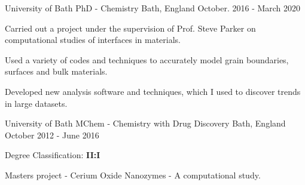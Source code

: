\begin{cventries}
  \cventry
    {University of Bath}
    {PhD - Chemistry}
    {Bath, England}
    {October. 2016 - March 2020}
    {
      \begin{cvitems}
        \item {Carried out a project under the supervision of Prof. Steve Parker on computational studies of interfaces in materials}.
        \item {Used a variety of codes and techniques to accurately model grain boundaries, surfaces and bulk materials.}
        \item {Developed new analysis software and techniques, which I used to discover trends in large datasets. }
      \end{cvitems}
    }
\end{cventries}

\begin{cventries}
  \cventry
    {University of Bath}
    {MChem - Chemistry with Drug Discovery}
    {Bath, England}
    {October 2012 - June 2016}
    {
      \begin{cvitems}
        \item {Degree Classification: \textbf{II:I}}
        \item {Masters project - Cerium Oxide Nanozymes - A computational study.}
      \end{cvitems}
    }
\end{cventries}
